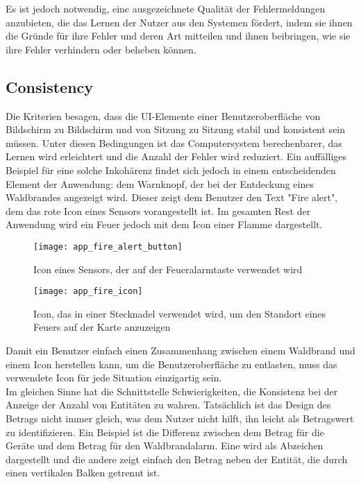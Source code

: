 Es ist jedoch notwendig, eine ausgezeichnete Qualität der Fehlermeldungen anzubieten, die das Lernen der Nutzer aus den Systemen fördert, indem sie ihnen die Gründe für ihre Fehler und deren Art mitteilen und ihnen beibringen, wie sie ihre Fehler verhindern oder beheben können.

\subsection{Consistency}

Die Kriterien besagen, dass die \ac{UI}-Elemente einer Benutzeroberfläche von Bildschirm zu Bildschirm und von Sitzung zu Sitzung stabil und konsistent sein müssen. Unter diesen Bedingungen ist das Computersystem berechenbarer, das Lernen wird erleichtert und die Anzahl der Fehler wird reduziert.
Ein auffälliges Beispiel für eine solche Inkohärenz findet sich jedoch in einem entscheidenden Element der Anwendung: dem Warnknopf, der bei der Entdeckung eines Waldbrandes angezeigt wird.
Dieser zeigt dem Benutzer den Text "Fire alert", dem das rote Icon eines Sensors vorangestellt ist.
Im gesamten Rest der Anwendung wird ein Feuer jedoch mit dem Icon einer Flamme dargestellt.

\begin{figure}[H]
  \centering
  \texttt{[image: app\_fire\_alert\_button]}
  \caption{Icon eines Sensors, der auf der Feueralarmtaste verwendet wird}
  \label{fig:app_fire_alert_button}
\end{figure}

\begin{figure}[H]
  \centering
  \texttt{[image: app\_fire\_icon]}
  \caption{Icon, das in einer Stecknadel verwendet wird, um den Standort eines Feuers auf der Karte anzuzeigen}
  \label{fig:app_fire_icon}
\end{figure}

Damit ein Benutzer einfach einen Zusammenhang zwischen einem Waldbrand und einem Icon herstellen kann, um die Benutzeroberfläche zu entlasten, muss das verwendete Icon für jede Situation einzigartig sein.\\

Im gleichen Sinne hat die Schnittstelle Schwierigkeiten, die Konsistenz bei der Anzeige der Anzahl von Entitäten zu wahren.
Tatsächlich ist das Design des Betrags nicht immer gleich, was dem Nutzer nicht hilft, ihn leicht als Betragswert zu identifizieren.
Ein Beispiel ist die Differenz zwischen dem Betrag für die Geräte und dem Betrag für den Waldbrandalarm.
Eine wird als Abzeichen dargestellt und die andere zeigt einfach den Betrag neben der Entität, die durch einen vertikalen Balken getrennt ist.

